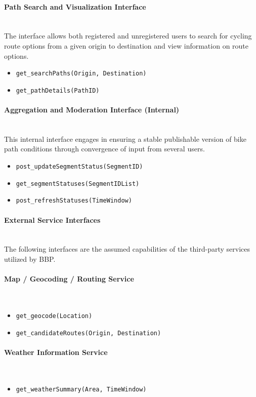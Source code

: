 \paragraph{Path Search and Visualization Interface} \mbox{}\\
The interface allows both registered and unregistered users to search for cycling route
options from a given origin to destination and view information on route options.
\begin{itemize}
    \item \texttt{get\_searchPaths(Origin, Destination)}
    \item \texttt{get\_pathDetails(PathID)}
\end{itemize}

\paragraph{Aggregation and Moderation Interface (Internal)} \mbox{}\\
This internal interface engages in ensuring a stable publishable version of bike path
conditions through convergence of input from several users.
\begin{itemize}
    \item \texttt{post\_updateSegmentStatus(SegmentID)}
    \item \texttt{get\_segmentStatuses(SegmentIDList)}
    \item \texttt{post\_refreshStatuses(TimeWindow)}
\end{itemize}

\paragraph{External Service Interfaces} \mbox{}\\
The following interfaces are the assumed capabilities of the third-party services utilized by BBP.

\paragraph{Map / Geocoding / Routing Service} \mbox{}\\
\begin{itemize}
    \item \texttt{get\_geocode(Location)}
    \item \texttt{get\_candidateRoutes(Origin, Destination)}
\end{itemize}

\paragraph{Weather Information Service} \mbox{}\\
\begin{itemize}
    \item \texttt{get\_weatherSummary(Area, TimeWindow)}
\end{itemize}

